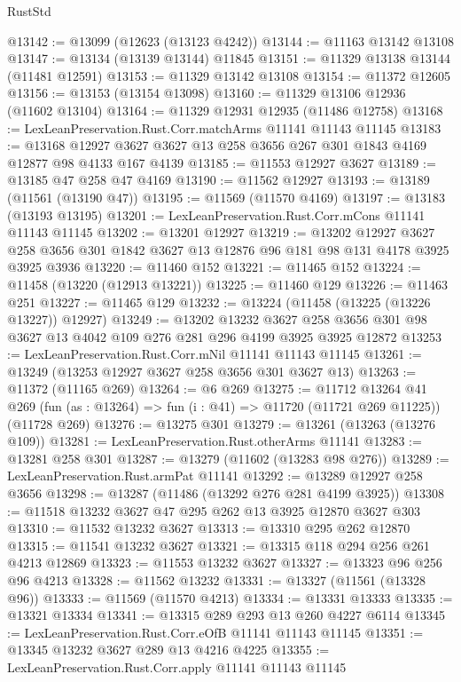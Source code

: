 \begin{lexlean}{RustStd}
\begin{coremodule}
@13142 := @13099 (@12623 (@13123 @4242))
@13144 := @11163 @13142 @13108
@13147 := @13134 (@13139 @13144) @11845
@13151 := @11329 @13138 @13144 (@11481 @12591)
@13153 := @11329 @13142 @13108
@13154 := @11372 @12605
@13156 := @13153 (@13154 @13098)
@13160 := @11329 @13106 @12936 (@11602 @13104)
@13164 := @11329 @12931 @12935 (@11486 @12758)
@13168 := LexLeanPreservation.Rust.Corr.matchArms @11141 @11143 @11145
@13183 := @13168 @12927 @3627 @3627 @13 @258 @3656 @267 @301 @1843 @4169 @12877 @98 @4133 @167 @4139
@13185 := @11553 @12927 @3627
@13189 := @13185 @47 @258 @47 @4169
@13190 := @11562 @12927
@13193 := @13189 (@11561 (@13190 @47))
@13195 := @11569 (@11570 @4169)
@13197 := @13183 (@13193 @13195)
@13201 := LexLeanPreservation.Rust.Corr.mCons @11141 @11143 @11145
@13202 := @13201 @12927
@13219 := @13202
    @12927
    @3627
    @258
    @3656
    @301
    @1842
    @3627
    @13
    @12876
    @96
    @181
    @98
    @131
    @4178
    @3925
    @3925
    @3936
@13220 := @11460 @152
@13221 := @11465 @152
@13224 := @11458 (@13220 (@12913 @13221))
@13225 := @11460 @129
@13226 := @11463 @251
@13227 := @11465 @129
@13232 := @13224 (@11458 (@13225 (@13226 @13227)) @12927)
@13249 := @13202
    @13232
    @3627
    @258
    @3656
    @301
    @98
    @3627
    @13
    @4042
    @109
    @276
    @281
    @296
    @4199
    @3925
    @3925
    @12872
@13253 := LexLeanPreservation.Rust.Corr.mNil @11141 @11143 @11145
@13261 := @13249 (@13253 @12927 @3627 @258 @3656 @301 @3627 @13)
@13263 := @11372 (@11165 @269)
@13264 := @6 @269
@13275 := @11712
    @13264
    @41
    @269
    (fun (as : @13264) => fun (i : @41) => @11720 (@11721 @269 @11225))
    (@11728 @269)
@13276 := @13275 @301
@13279 := @13261 (@13263 (@13276 @109))
@13281 := LexLeanPreservation.Rust.otherArms @11141
@13283 := @13281 @258 @301
@13287 := @13279 (@11602 (@13283 @98 @276))
@13289 := LexLeanPreservation.Rust.armPat @11141
@13292 := @13289 @12927 @258 @3656
@13298 := @13287 (@11486 (@13292 @276 @281 @4199 @3925))
@13308 := @11518 @13232 @3627 @47 @295 @262 @13 @3925 @12870 @3627 @303
@13310 := @11532 @13232 @3627
@13313 := @13310 @295 @262 @12870
@13315 := @11541 @13232 @3627
@13321 := @13315 @118 @294 @256 @261 @4213 @12869
@13323 := @11553 @13232 @3627
@13327 := @13323 @96 @256 @96 @4213
@13328 := @11562 @13232
@13331 := @13327 (@11561 (@13328 @96))
@13333 := @11569 (@11570 @4213)
@13334 := @13331 @13333
@13335 := @13321 @13334
@13341 := @13315 @289 @293 @13 @260 @4227 @6114
@13345 := LexLeanPreservation.Rust.Corr.eOfB @11141 @11143 @11145
@13351 := @13345 @13232 @3627 @289 @13 @4216 @4225
@13355 := LexLeanPreservation.Rust.Corr.apply @11141 @11143 @11145

\end{coremodule}
\end{lexlean}
